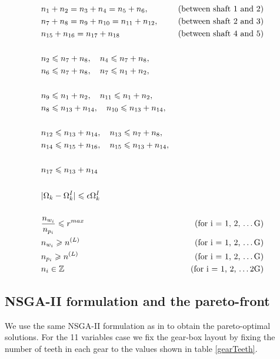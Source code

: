 \begin{singlespacing}
\begin{flushleft}

{\allowdisplaybreaks
\begin{align}
& n_1 + n_2 = n_3 + n_4 = n_5 + n_6,  \quad &\left. \text{(between shaft 1 and 2)} \right.\nonumber\\
& n_7 + n_8 = n_9 + n_{10} = n_{11} + n_{12}, \quad &\left. \text{(between shaft 2 and 3)} \right.\nonumber\\
& n_{15} + n_{16} = n_{17} + n_{18} \quad &\left. \text{(between shaft 4 and 5)} \right.\\
\nonumber\\
&n_2 \leqslant n_7 + n_8, \quad n_4 \leqslant n_7 + n_8, \nonumber\\
&n_6 \leqslant n_7 + n_8, \quad n_7 \leqslant n_1 + n_2, \\
\nonumber\\
&n_9 \leqslant n_1 + n_2, \quad n_{11} \leqslant n_1 + n_2, \nonumber\\
&n_8 \leqslant n_{13} + n_{14}, \quad n_{10} \leqslant n_{13} + n_{14},\\
\nonumber\\
&n_{12} \leqslant n_{13} + n_{14}, \quad n_{13} \leqslant n_7 + n_8, \nonumber\\
&n_{14} \leqslant n_{15} + n_{16}, \quad n_{15} \leqslant n_{13} + n_{14},\\
\nonumber\\
& n_{17} \leqslant n_{13} + n_{14}\\
\nonumber\\
& | {\Omega}_k - {\Omega}^I_k | \leqslant \epsilon {\Omega}^I_k\\
\nonumber\\
& \frac{n_{w_i}} {n_{p_i}}  \leqslant r^{max} \quad &\left. \text{(for i = 1, 2, \dots G)} \right.\nonumber\\
& n_{w_i} \geqslant n^{(L)} &\left. \text{(for i = 1, 2, \dots G)} \right.\nonumber\\
& n_{p_i} \geqslant n^{(L)} &\left. \text{(for i = 1, 2, \dots G)} \right.\nonumber\\
& n_i \in \mathbb{Z} &\left. \text{(for i = 1, 2, \dots 2G)} \right.
\end{align}
}
\end{flushleft}
\end{singlespacing}

\subsection{NSGA-II formulation and the pareto-front}
We use the same NSGA-II formulation as in \cite{debgt} to obtain the
pareto-optimal solutions. For the 11 variables case we fix the 
gear-box layout by fixing the number of teeth in each gear to the 
values shown in table \ref{gearTeeth}. 


